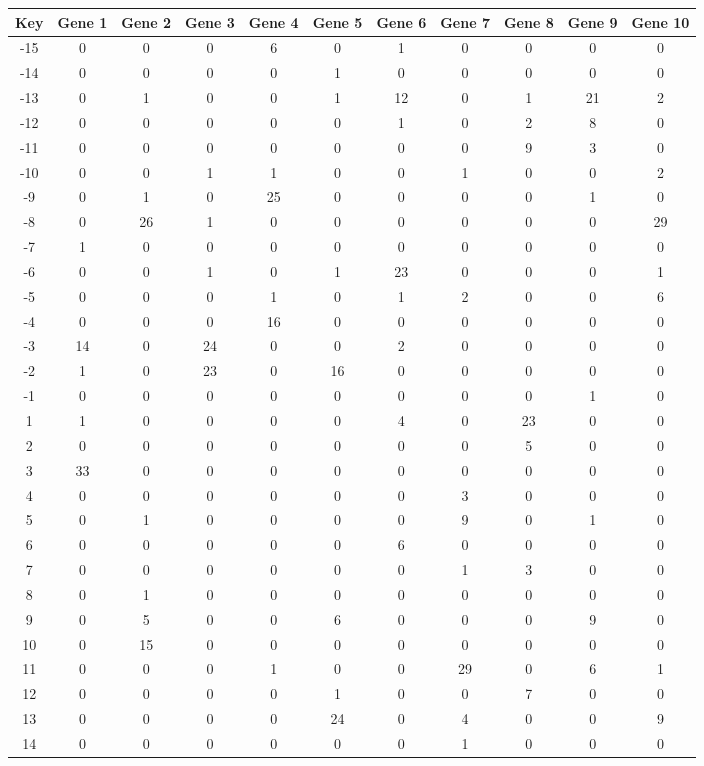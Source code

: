 \begin{tabular}{|c|c|c|c|c|c|c|c|c|c|c|}
\hline
Key & Gene 1 & Gene 2 & Gene 3 & Gene 4 & Gene 5 & Gene 6 & Gene 7 & Gene 8 & Gene 9 & Gene 10 \\
\hline
-15 & 0 & 0 & 0 & 6 & 0 & 1 & 0 & 0 & 0 & 0 \\
-14 & 0 & 0 & 0 & 0 & 1 & 0 & 0 & 0 & 0 & 0 \\
-13 & 0 & 1 & 0 & 0 & 1 & 12 & 0 & 1 & 21 & 2 \\
-12 & 0 & 0 & 0 & 0 & 0 & 1 & 0 & 2 & 8 & 0 \\
-11 & 0 & 0 & 0 & 0 & 0 & 0 & 0 & 9 & 3 & 0 \\
-10 & 0 & 0 & 1 & 1 & 0 & 0 & 1 & 0 & 0 & 2 \\
-9 & 0 & 1 & 0 & 25 & 0 & 0 & 0 & 0 & 1 & 0 \\
-8 & 0 & 26 & 1 & 0 & 0 & 0 & 0 & 0 & 0 & 29 \\
-7 & 1 & 0 & 0 & 0 & 0 & 0 & 0 & 0 & 0 & 0 \\
-6 & 0 & 0 & 1 & 0 & 1 & 23 & 0 & 0 & 0 & 1 \\
-5 & 0 & 0 & 0 & 1 & 0 & 1 & 2 & 0 & 0 & 6 \\
-4 & 0 & 0 & 0 & 16 & 0 & 0 & 0 & 0 & 0 & 0 \\
-3 & 14 & 0 & 24 & 0 & 0 & 2 & 0 & 0 & 0 & 0 \\
-2 & 1 & 0 & 23 & 0 & 16 & 0 & 0 & 0 & 0 & 0 \\
-1 & 0 & 0 & 0 & 0 & 0 & 0 & 0 & 0 & 1 & 0 \\
1 & 1 & 0 & 0 & 0 & 0 & 4 & 0 & 23 & 0 & 0 \\
2 & 0 & 0 & 0 & 0 & 0 & 0 & 0 & 5 & 0 & 0 \\
3 & 33 & 0 & 0 & 0 & 0 & 0 & 0 & 0 & 0 & 0 \\
4 & 0 & 0 & 0 & 0 & 0 & 0 & 3 & 0 & 0 & 0 \\
5 & 0 & 1 & 0 & 0 & 0 & 0 & 9 & 0 & 1 & 0 \\
6 & 0 & 0 & 0 & 0 & 0 & 6 & 0 & 0 & 0 & 0 \\
7 & 0 & 0 & 0 & 0 & 0 & 0 & 1 & 3 & 0 & 0 \\
8 & 0 & 1 & 0 & 0 & 0 & 0 & 0 & 0 & 0 & 0 \\
9 & 0 & 5 & 0 & 0 & 6 & 0 & 0 & 0 & 9 & 0 \\
10 & 0 & 15 & 0 & 0 & 0 & 0 & 0 & 0 & 0 & 0 \\
11 & 0 & 0 & 0 & 1 & 0 & 0 & 29 & 0 & 6 & 1 \\
12 & 0 & 0 & 0 & 0 & 1 & 0 & 0 & 7 & 0 & 0 \\
13 & 0 & 0 & 0 & 0 & 24 & 0 & 4 & 0 & 0 & 9 \\
14 & 0 & 0 & 0 & 0 & 0 & 0 & 1 & 0 & 0 & 0 \\
\hline
\end{tabular}